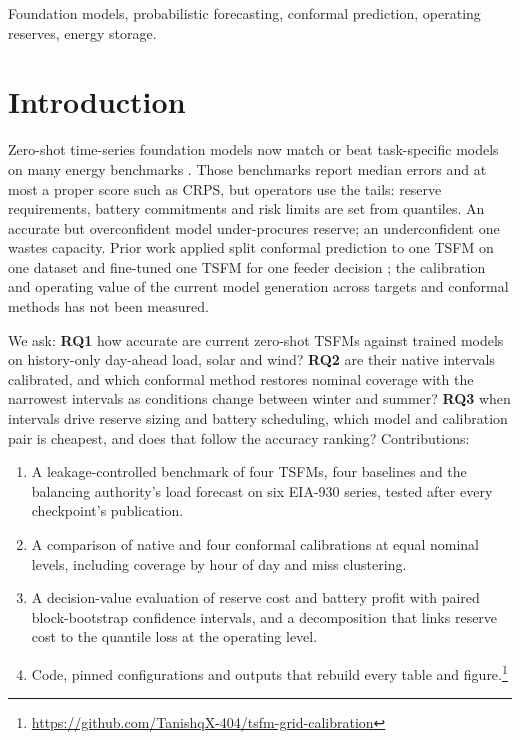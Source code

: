 \documentclass[conference]{IEEEtran}
\begin{document}
\begin{IEEEkeywords}
Foundation models, probabilistic forecasting, conformal prediction, operating reserves, energy storage.
\end{IEEEkeywords}

\section{Introduction}
Zero-shot time-series foundation models now match or beat task-specific models on many energy benchmarks \cite{prior_ercot_tsfm,prior_fets,prior_consumer}. Those benchmarks report median errors and at most a proper score such as CRPS, but operators use the tails: reserve requirements, battery commitments and risk limits are set from quantiles. An accurate but overconfident model under-procures reserve; an underconfident one wastes capacity. Prior work applied split conformal prediction to one TSFM on one dataset \cite{prior_conformal_ercot} and fine-tuned one TSFM for one feeder decision \cite{prior_dfl}; the calibration and operating value of the current model generation across targets and conformal methods has not been measured.

We ask: \textbf{RQ1} how accurate are current zero-shot TSFMs against trained models on history-only day-ahead load, solar and wind? \textbf{RQ2} are their native intervals calibrated, and which conformal method restores nominal coverage with the narrowest intervals as conditions change between winter and summer? \textbf{RQ3} when intervals drive reserve sizing and battery scheduling, which model and calibration pair is cheapest, and does that follow the accuracy ranking? Contributions:
\begin{enumerate}
\item A leakage-controlled benchmark of four TSFMs, four baselines and the balancing authority's load forecast on six EIA-930 series, tested after every checkpoint's publication.
\item A comparison of native and four conformal calibrations at equal nominal levels, including coverage by hour of day and miss clustering.
\item A decision-value evaluation of reserve cost and battery profit with paired block-bootstrap confidence intervals, and a decomposition that links reserve cost to the quantile loss at the operating level.
\item Code, pinned configurations and outputs that rebuild every table and figure.\footnote{\url{https://github.com/TanishqX-404/tsfm-grid-calibration}}
\end{enumerate}
\end{document}
